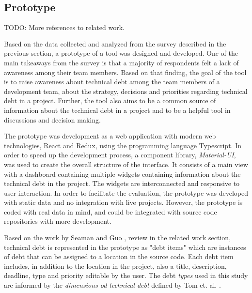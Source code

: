 \subsection{Prototype}

TODO: More references to related work.


Based on the data collected and analyzed from the survey described in the previous section, a prototype of a tool was designed and developed.
One of the main takeaways from the survey is that a majority of respondents felt a lack of awareness among their team members.
Based on that finding, the goal of the tool is to raise awareness about technical debt among the team members of a development team, about the strategy, decisions and priorities regarding technical debt in a project.
Further, the tool also aims to be a common source of information about the technical debt in a project and to be a helpful tool in discussions and decision making.

The prototype was development as a web application with modern web technologies, React and Redux, using the programming language Typescript.
In order to speed up the development process, a component library, \textit{Material-UI}, was used to create the overall structure of the interface.
It consists of a main view with a dashboard containing multiple widgets containing information about the technical debt in the project.
The widgets are interconnected and responsive to user interaction.
In order to facilitate the evaluation, the prototype was developed with static data and no integration with live projects.
However, the prototype is coded with real data in mind, and could be integrated with source code repositories with more development.

Based on the work by Seaman and Guo \cite{seaman_measuring_2011}, review in the related work section, technical debt is represented in the prototype as "debt items" which are instances of debt that can be assigned to a location in the source code.
Each debt item includes, in addition to the location in the project, also a title, description, deadline, type and priority editable by the user.
The debt \textit{types} used in this study are informed by the \textit{dimensions od technical debt} defined by Tom et. al. \cite{tom_exploration_2013}.

